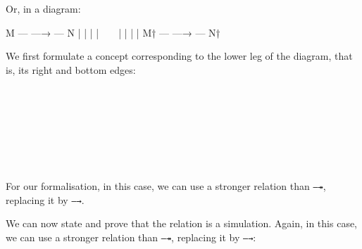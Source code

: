 Or, in a diagram:

\begin{myDisplay}
M  --- —→ --- N
|             |
|             |
~             ~
|             |
|             |
M† --- —→ --- N†
\end{myDisplay}

We first formulate a concept corresponding to the lower leg of the
diagram, that is, its right and bottom edges:

\begin{fence}
\begin{code}%
\>[0]\AgdaSpace{}%
\AgdaSpace{}%
\AgdaSymbol{\{}\AgdaSpace{}%
\AgdaSymbol{\}}\AgdaSpace{}%
\AgdaSymbol{(}\AgdaSpace{}%
\AgdaSpace{}%
\AgdaSymbol{:}\AgdaSpace{}%
\AgdaSpace{}%
\AgdaSpace{}%
\AgdaSymbol{)}\AgdaSpace{}%
\AgdaSymbol{:}\AgdaSpace{}%
\AgdaSpace{}%
\<%
\\
%
\\[\AgdaEmptyExtraSkip]%
\>[0][@{}l@{\AgdaIndent{0}}]%
\>[2]\AgdaSpace{}%
\AgdaSymbol{:}\AgdaSpace{}%
\AgdaSpace{}%
\AgdaSymbol{\{}\AgdaSpace{}%
\AgdaSymbol{:}\AgdaSpace{}%
\AgdaSpace{}%
\AgdaSpace{}%
\AgdaSymbol{\}}\<%
\\
\>[2][@{}l@{\AgdaIndent{0}}]%
\>[4]\AgdaSpace{}%
\AgdaSpace{}%
\AgdaOperator{\AgdaDatatype{\textasciitilde{}}}\AgdaSpace{}%
\<%
\\
%
\>[4]%
\>[467I]\AgdaSpace{}%
\AgdaSpace{}%
\<%
\\
\>[.][@{}l@{}]\<[467I]%
\>[6]\AgdaComment{--------}\<%
\\
%
\>[4]\AgdaSpace{}%
\AgdaSpace{}%
\AgdaSpace{}%
\<%
\end{code}
\end{fence}

For our formalisation, in this case, we can use a stronger relation than
\texttt{—↠}, replacing it by \texttt{—→}.

We can now state and prove that the relation is a simulation. Again, in
this case, we can use a stronger relation than \texttt{—↠}, replacing it
by \texttt{—→}:

